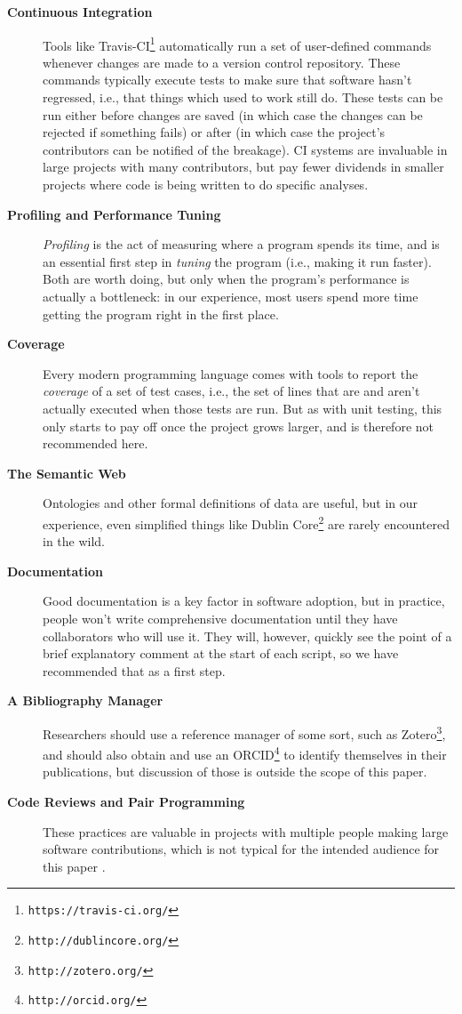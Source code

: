 \documentclass[10pt,letterpaper]{article}
\newcommand{\withurl}[2]{{#1}\footnote{{\texttt{#2}}}}
\begin{document}
\begin{description}
\item[\textbf{Continuous Integration}] Tools like
  \withurl{Travis-CI}{https://travis-ci.org/} automatically run a set
  of user-defined commands whenever changes are made to a version
  control repository. These commands typically execute tests to make
  sure that software hasn't regressed, i.e., that things which used to
  work still do. These tests can be run either before changes are
  saved (in which case the changes can be rejected if something fails)
  or after (in which case the project's contributors can be notified
  of the breakage). CI systems are invaluable in large projects with
  many contributors, but pay fewer dividends in smaller projects where
  code is being written to do specific analyses.

\item[\textbf{Profiling and Performance Tuning}] \emph{Profiling} is
  the act of measuring where a program spends its time, and is an
  essential first step in \emph{tuning} the program (i.e., making it
  run faster). Both are worth doing, but only when the program's
  performance is actually a bottleneck: in our experience, most users
  spend more time getting the program right in the first place.

\item[\textbf{Coverage}] Every modern programming language comes with
  tools to report the \emph{coverage} of a set of test cases, i.e.,
  the set of lines that are and aren't actually executed when those
  tests are run. But as with unit testing, this only starts to pay off
  once the project grows larger, and is therefore not recommended
  here.

\item[\textbf{The Semantic Web}] Ontologies and other formal
  definitions of data are useful, but in our experience, even
  simplified things like \withurl{Dublin Core}{http://dublincore.org/}
  are rarely encountered in the wild.

\item[\textbf{Documentation}] Good documentation is a key factor in
  software adoption, but in practice, people won't write comprehensive
  documentation until they have collaborators who will use it. They
  will, however, quickly see the point of a brief explanatory comment
  at the start of each script, so we have recommended that as a first
  step.

\item[\textbf{A Bibliography Manager}] Researchers should use a
  reference manager of some sort, such as
  \withurl{Zotero}{http://zotero.org/}, and should also obtain and use
  an \withurl{ORCID}{http://orcid.org/} to identify themselves in
  their publications, but discussion of those is outside the scope of
  this paper.

\item[\textbf{Code Reviews and Pair Programming}] These practices are
  valuable in projects with multiple people making large software
  contributions, which is not typical for the intended audience for
  this paper \cite{petre2014}.

\end{description}
\end{document}
